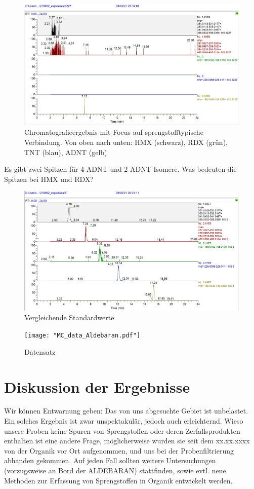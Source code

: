 \begin{figure}[htb]
\includegraphics[height=\textheight,%
                   width=\textwidth,%
                   keepaspectratio]{"Explosives_3227_SampleW1.PNG"}
\caption{Chromatografieergebnis mit Focus auf sprengstofftypische Verbindung. Von oben nach unten: HMX (schwarz), RDX (grün), TNT (blau), ADNT (gelb)}
\end{figure}
Es gibt zwei Spitzen für 4-ADNT und 2-ADNT-Isomere.
Was bedeuten die Spitzen bei HMX und RDX?

\begin{figure}[htb]
\includegraphics[height=\textheight,%
                   width=\textwidth,%
                   keepaspectratio]{"Explosives_5ppb.PNG"}
\caption{Vergleichende Standardwerte}
\end{figure}
\begin{figure}[htb]
\texttt{[image: "MC\_data\_Aldebaran.pdf"]}
\caption{Datensatz}
\end{figure}
\section[Diskussion der Ergebnisse]{Diskussion der Ergebnisse}
Wir können Entwarnung geben: Das von uns abgesuchte Gebiet ist unbelastet. Ein
solches Ergebnis ist zwar unspektakulär, jedoch auch erleichternd. Wieso 
unsere Proben keine Spuren von Sprengstoffen oder deren Zerfallsprodukten 
enthalten ist eine andere Frage, möglicherweise wurden sie seit dem xx.xx.xxxx%
von der Organik vor Ort aufgenommen, und uns bei der Probenfiltrierung
abhanden gekommen. Auf jeden Fall sollten weitere Untersuchungen (vorzugsweise
an Bord der ALDEBARAN) stattfinden, sowie evtl. neue Methoden zur Erfassung
von Sprengstoffen in Organik entwickelt werden.
